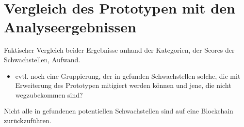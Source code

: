\section{Vergleich des Prototypen mit den Analyseergebnissen}
\label{sec:comparison}
    Faktischer Vergleich beider Ergebnisse anhand der Kategorien, der Scores der Schwachstellen, Aufwand.
    \begin{itemize}[noitemsep]
        \item evtl. noch eine Gruppierung, der in  gefunden Schwachstellen solche, die mit Erweiterung des Prototypen mitigiert werden können und jene, die nicht wegzubekommen sind?
    \end{itemize}
    Nicht alle in  gefundenen potentiellen Schwachstellen sind auf eine Blockchain zurückzuführen.
    